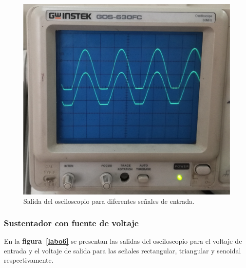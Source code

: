 \documentclass[letter,twoside,11pt]{article}
\begin{document}
\begin{figure}[!h]
\includegraphics[scale=0.096]{fotos/labo1.11.eps}
\caption{Salida del osciloscopio para diferentes señales de entrada.}
\label{labo5}
\end{figure}

\subsubsection{Sustentador con fuente de voltaje}
En la \textbf{figura~\ref{labo6}} se presentan las salidas del osciloscopio para
el voltaje de entrada y el voltaje de salida para las señales rectangular,
triangular y senoidal respectivamente.
\end{document}
